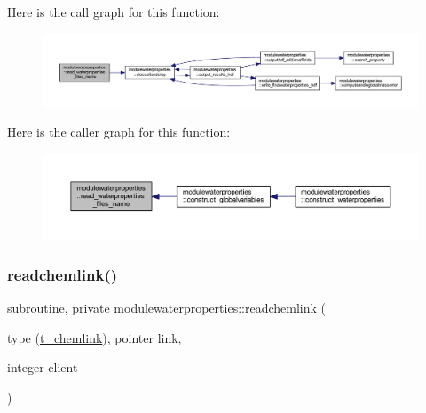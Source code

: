 Here is the call graph for this function\+:\nopagebreak
\begin{figure}[H]
\begin{center}
\leavevmode
\includegraphics[width=350pt]{namespacemodulewaterproperties_ae31629679bdc4c42e1d3884a2f046435_cgraph}
\end{center}
\end{figure}
Here is the caller graph for this function\+:\nopagebreak
\begin{figure}[H]
\begin{center}
\leavevmode
\includegraphics[width=350pt]{namespacemodulewaterproperties_ae31629679bdc4c42e1d3884a2f046435_icgraph}
\end{center}
\end{figure}
\mbox{\label{namespacemodulewaterproperties_a9745c5b394a2c3fc11587bda05c362d6}} 
\subsubsection{\texorpdfstring{readchemlink()}{readchemlink()}}
{\footnotesize\ttfamily subroutine, private modulewaterproperties\+::readchemlink (\begin{DoxyParamCaption}\item[{type (\mbox{\hyperlink{structmodulewaterproperties_1_1t__chemlink}{t\+\_\+chemlink}}), pointer}]{link,  }\item[{integer}]{client }\end{DoxyParamCaption})\hspace{0.3cm}{\ttfamily [private]}}

